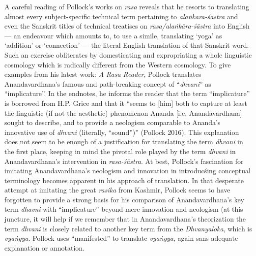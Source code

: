 A careful reading of Pollock’s works on \textsl{rasa} reveals that he resorts to translating almost every subject-specific technical term pertaining to \textsl{alaṅkara-śāstra} and even the Sanskrit titles of technical treatises on \textsl{rasa/alaṅkāra-śāstra} into English --- an endeavour which amounts to, to use a simile, translating ‘yoga’ as ‘addition’ or ‘connection’ --- the literal English translation of that Sanskrit word. Such an exercise obliterates by domesticating and expropriating a whole linguistic cosmology which is radically different from the Western cosmology. To give examples from his latest work: \textsl{A Rasa Reader}, Pollock translates Anandavardhana’s famous and path-breaking concept of “\textsl{dhvani}” as “implicature”. In the endnotes, he informs the reader that the term “implicature” is borrowed from H.P. Grice and that it “seems to [him] both to capture at least the linguistic (if not the aesthetic) phenomenon Ananda [i.e. Anandavardhana] sought to describe, and to provide a neologism comparable to Ananda’s innovative use of \textsl{dhvani} (literally, “sound”)” (Pollock 2016). This explanation does not seem to be enough of a justification for translating the term \textsl{dhvani} in the first place, keeping in mind the pivotal role played by the term \textsl{dhvani} in Anandavardhana’s intervention in \textsl{rasa-śāstra}. At best, Pollock’s fascination for imitating Anandavardhana’s neologism and innovation in introducśing conceptual terminology becomes apparent in his approach of translation. In that desperate attempt at imitating the great \textsl{rasika} from Kashmir, Pollock seems to have forgotten to provide a strong basis for his comparison of Anandavardhana’s key term \textsl{dhavni} with “implicature” beyond mere innovation and neologism (at this juncture, it will help if we remember that in Anandavardhana’s theorization the term \textsl{dhvani} is closely related to another key term from the \textsl{Dhvanyaloka}, which is \textsl{vyaṅgya}. Pollock uses “manifested” to translate \textsl{vyaṅgya}, again sans adequate explanation or annotation. 

